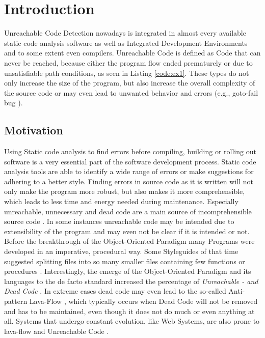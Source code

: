 
\chapter{Introduction}
\label{cha:introduction}

Unreachable Code Detection nowadays is integrated in almost every available static code analysis software as well as Integrated Development Environments and to some extent even compilers.
Unreachable Code is defined as Code that can never be reached, because either the program flow ended prematurely or due to unsatisfiable path conditions, as seen in Listing \ref{code:ex1}.
These types do not only increase the size of the program, but also increase the overall complexity of the source code or may even lead to unwanted behavior and errors (e.g., goto-fail bug \cite{Boyes_2014}).

\section{Motivation}
\label{sec:motivation}
Using Static code analysis to find errors before compiling, building or rolling out software is a very essential part of the software development process.
Static code analysis tools are able to identify a wide range of errors or make suggestions for adhering to a better style.
Finding errors in source code as it is written will not only make the program more robust, but also makes it more comprehensible, which leads to less time and energy needed during maintenance.
Especially unreachable, unnecessary and dead code are a main source of incomprehensible source code \cite{Romano_2020}.
In some instances unreachable code may be intended due to extensibility of the program \cite{Haas_2020} and may even not be clear if it is intended or not.
Before the breakthrough of the Object-Oriented Paradigm many Programs were developed in an imperative, procedural way. Some Styleguides of that time suggested splitting files into so many smaller files containing few functions or procedures \cite{Srivastava_1992}.
Interestingly, the emerge of the Object-Oriented Paradigm and its languages to the de facto standard increased the percentage of \emph{Unreachable - and Dead Code} \cite{Srivastava_1992}.
In extreme cases dead code may even lead to the so-called Anti-pattern Lava-Flow \cite{Romano_2020}, which typically occurs when Dead Code will not be removed and has to be maintained, even though it does not do much or even anything at all.
Systems that undergo constant evolution, like Web Systems, are also prone to lava-flow and Unreachable Code \cite{Boomsma_2012}.

